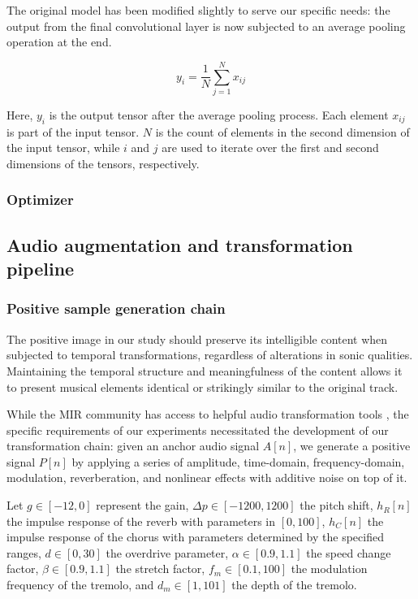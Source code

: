 The original model has been modified slightly to serve our specific needs: the output from the final convolutional layer is now subjected to an average pooling operation at the end.

\begin{equation}
y_i = \frac{1}{N} \sum_{j=1}^{N} x_{ij}
\end{equation}

Here, $y_i$ is the output tensor after the average pooling process. Each element $x_{ij}$ is part of the input tensor. $N$ is the count of elements in the second dimension of the input tensor, while $i$ and $j$ are used to iterate over the first and second dimensions of the tensors, respectively.

\subsubsection{Optimizer}

\subsection{Audio augmentation and transformation pipeline}

\subsubsection{Positive sample generation chain}

The positive image in our study should preserve its intelligible content when subjected to temporal transformations, regardless of alterations in sonic qualities. Maintaining the temporal structure and meaningfulness of the content allows it to present musical elements identical or strikingly similar to the original track.

While the MIR community has access to helpful audio transformation tools \cite{Spijkervet2021Spijkervet/torchaudio-augmentations:V1.0}, the specific requirements of our experiments necessitated the development of our transformation chain: given an anchor audio signal $A[n]$, we generate a positive signal $P[n]$ by applying a series of amplitude, time-domain, frequency-domain, modulation, reverberation, and nonlinear effects with additive noise on top of it. 

Let $g \in [-12, 0]$ represent the gain, $\Delta p \in [-1200, 1200]$ the pitch shift, $h_R[n]$ the impulse response of the reverb with parameters in $[0, 100]$, $h_C[n]$ the impulse response of the chorus with parameters determined by the specified ranges, $d \in [0, 30]$ the overdrive parameter, $\alpha \in [0.9, 1.1]$ the speed change factor, $\beta \in [0.9, 1.1]$ the stretch factor, $f_m \in [0.1, 100]$ the modulation frequency of the tremolo, and $d_m \in [1, 101]$ the depth of the tremolo. 

